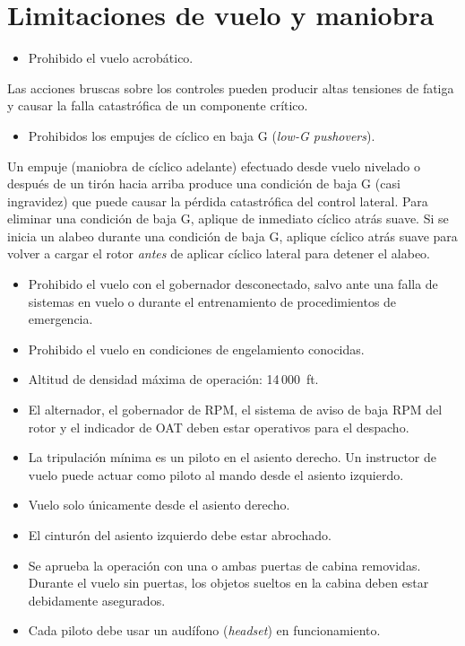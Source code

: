 \section{Limitaciones de vuelo y maniobra}

\begin{itemize}
\item Prohibido el vuelo acrobático.
\end{itemize}

\begin{precaucion}
Las acciones bruscas sobre los controles pueden producir altas tensiones de fatiga y causar la falla catastrófica de un componente crítico.
\end{precaucion}

\begin{itemize}
\item Prohibidos los empujes de cíclico en baja G (\emph{low-G pushovers}).
\end{itemize}

\begin{precaucion}
Un empuje (maniobra de cíclico adelante) efectuado desde vuelo nivelado o después de un tirón hacia arriba produce una condición de baja G (casi ingravidez) que puede causar la pérdida catastrófica del control lateral. Para eliminar una condición de baja G, aplique de inmediato cíclico atrás suave. Si se inicia un alabeo durante una condición de baja G, aplique cíclico atrás suave para volver a cargar el rotor \emph{antes} de aplicar cíclico lateral para detener el alabeo.
\end{precaucion}

\begin{itemize}
\item Prohibido el vuelo con el gobernador desconectado, salvo ante una falla de sistemas en vuelo o durante el entrenamiento de procedimientos de emergencia.
\item Prohibido el vuelo en condiciones de engelamiento conocidas.
\item Altitud de densidad máxima de operación: 14\,000~ft.
\item El alternador, el gobernador de RPM, el sistema de aviso de baja RPM del rotor y el indicador de OAT deben estar operativos para el despacho.
\item La tripulación mínima es un piloto en el asiento derecho. Un instructor de vuelo puede actuar como piloto al mando desde el asiento izquierdo.
\item Vuelo solo únicamente desde el asiento derecho.
\item El cinturón del asiento izquierdo debe estar abrochado.
\item Se aprueba la operación con una o ambas puertas de cabina removidas. Durante el vuelo sin puertas, los objetos sueltos en la cabina deben estar debidamente asegurados.
\item Cada piloto debe usar un audífono (\emph{headset}) en funcionamiento.
\end{itemize}

